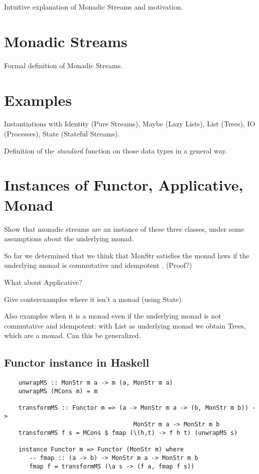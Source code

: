 \documentclass{article}
\begin{document}
Intuitive explanation of Monadic Streams and motivation.

\section{Monadic Streams}

Formal definition of Monadic Streams.

\section{Examples}

Instantiations with Identity (Pure Streams), Maybe (Lazy Lists), List (Trees), IO (Processes), State (Stateful Streams).

Definition of the {\em standard} function on those data types in a general way.

\section{Instances of Functor, Applicative, Monad}

Show that monadic streams are an instance of these three classes, under some assumptions about the underlying monad.

So far we determined that we think that MonStr satisfies the monad laws if the underlying monad is commutative and idempotent \cite{idempotent_monads}. (Proof?)

What about Applicative?

Give conterexamples where it isn't a monad (using State).

Also examples when it is a monad even if the underlying monad is not commutative and idempotent: with List as underlying monad we obtain Trees, which are a monad. Can this be generalized.

\subsection{Functor instance in Haskell}

\begin{lstlisting}
	unwrapMS :: MonStr m a -> m (a, MonStr m a)
	unwrapMS (MCons m) = m

	transformMS :: Functor m => (a -> MonStr m a -> (b, MonStr m b)) -> 
	                                MonStr m a -> MonStr m b
	transformMS f s = MCons $ fmap (\(h,t) -> f h t) (unwrapMS s)

	instance Functor m => Functor (MonStr m) where
	   -- fmap :: (a -> b) -> MonStr m a -> MonStr m b
	   fmap f = transformMS (\a s -> (f a, fmap f s))
\end{lstlisting}
\end{document}
